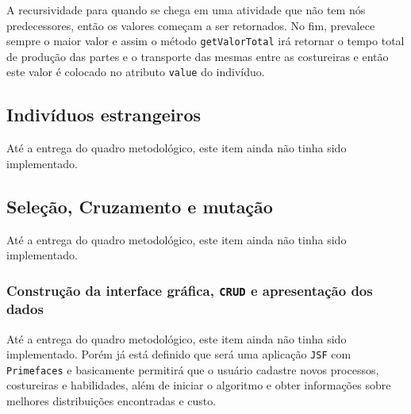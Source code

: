 A recursividade para quando se chega em uma atividade que não tem nós predecessores, então os valores começam a ser retornados. 
No fim, prevalece sempre o maior valor e assim o método \texttt{getValorTotal} irá retornar o tempo total de 
produção das partes e o transporte das mesmas entre as costureiras e então este valor é colocado no atributo \texttt{value} do 
indivíduo.


\subsection{Indivíduos estrangeiros}
\par Até a entrega do quadro metodológico, este item ainda não tinha sido implementado.
  
\subsection{Seleção, Cruzamento e mutação}
 \par Até a entrega do quadro metodológico, este item ainda não tinha sido implementado.
 
\subsubsection{Construção da interface gráfica, \texttt{CRUD} e apresentação dos dados}
\par Até a entrega do quadro metodológico, este item ainda não tinha sido implementado.
Porém já está definido que será uma aplicação \texttt{JSF} com \texttt{Primefaces} e 
basicamente permitirá que o usuário cadastre novos processos, costureiras e habilidades,
além de iniciar o algoritmo e obter informações sobre melhores distribuições encontradas
e custo. 



